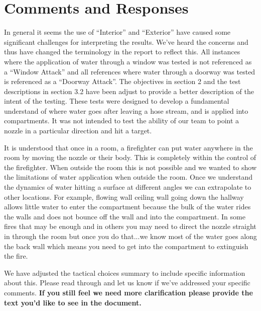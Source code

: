 \documentclass[12pt,oneside]{book}
\begin{document}
\newpage



\chapter*{Comments and Responses}
\label{comments}
In general it seems the use of ``Interior'' and ``Exterior'' have caused some significant challenges for interpreting the results. We've heard the concerns and thus have changed the terminology in the report to reflect this. All instances where the application of water through a window was tested is not referenced as a ``Window Attack'' and all references where water through a doorway was tested is referenced as a ``Doorway Attack''. The objectives in section 2 and the test descriptions in section 3.2 have been adjust to provide a better description of the intent of the testing. These tests were designed to develop a fundamental understand of where water goes after leaving a hose stream, and is applied into compartments. It was not intended to test the ability of our team to point a nozzle in a particular direction and hit a target. 

It is understood that once in a room, a firefighter can put water anywhere in the room by moving the nozzle or their body.  This is completely within the control of the firefighter.  When outside the room this is not possible and we wanted to show the limitations of water application when outside the room. Once we understand the dynamics of water hitting a surface at different angles we can extrapolate to other locations.  For example, flowing wall ceiling wall going down the hallway allows little water to enter the compartment because the bulk of the water rides the walls and does not bounce off the wall and into the compartment.  In some fires that may be enough and in others you may need to direct the nozzle straight in through the room but once you do that...we know most of the water goes along the back wall which means you need to get into the compartment to extinguish the fire.   

We have adjusted the tactical choices summary to include specific information about this. Please read through and let us know if we've addressed your specific comments. \textbf{If you still feel we need more clarification please provide the text you'd like to see in the document.}
\end{document}
